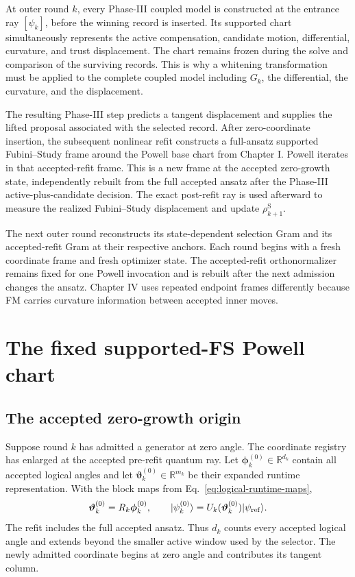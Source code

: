 \documentclass[10pt,twocolumn]{article}
\newcommand{\ket}[1]{\lvert #1\rangle}
\begin{document}
At outer round \(k\), every Phase-III coupled model is constructed at the
entrance ray \([\psi_k]\), before the winning record is inserted. Its supported
chart simultaneously represents the active compensation, candidate motion,
differential, curvature, and trust displacement. The chart remains frozen
during the solve and comparison of the surviving records. This is
why a whitening transformation must be applied to the complete coupled model
including \(G_k\), the differential, the curvature, and the displacement.

The resulting Phase-III step predicts a tangent displacement and supplies the
lifted proposal associated with the selected record. After zero-coordinate
insertion, the subsequent nonlinear refit constructs
a full-ansatz supported Fubini--Study frame around the Powell base chart from
Chapter I. Powell iterates in that accepted-refit frame. This is a new frame at
the accepted zero-growth state, independently rebuilt from the full accepted
ansatz after the Phase-III active-plus-candidate decision. The exact post-refit
ray is used afterward to
measure the realized Fubini--Study displacement and update
\(\rho_{k+1}^{\mathrm S}\).

The next outer round reconstructs its state-dependent selection Gram and its
accepted-refit Gram at their respective anchors. Each round begins with a fresh
coordinate frame and fresh optimizer state. The accepted-refit orthonormalizer
remains fixed for one Powell invocation and is rebuilt after the next admission
changes the ansatz. Chapter IV uses repeated endpoint frames differently
because FM carries curvature information between accepted inner moves.

\section*{The fixed supported-FS Powell chart}

\subsection*{The accepted zero-growth origin}

Suppose round \(k\) has admitted a generator at zero angle. The coordinate
registry has enlarged at the accepted pre-refit quantum ray. Let
\(\bm\phi_k^{(0)}\in\mathbb R^{d_k}\) contain all accepted logical
angles and let \(\bm\vartheta_k^{(0)}\in\mathbb R^{m_k}\) be their expanded
runtime representation. With the block maps from
Eq.~\eqref{eq:logical-runtime-maps},
\begin{equation}
\bm\vartheta_k^{(0)}=R_k\bm\phi_k^{(0)},
\qquad
\ket{\psi_k^{(0)}}
=U_k(\bm\vartheta_k^{(0)})\ket{\psi_{\rm ref}}.
\label{eq:sr-refit-origin}
\end{equation}
The refit includes the full accepted ansatz. Thus \(d_k\) counts every
accepted logical angle and extends beyond the smaller active window used by the
selector. The newly admitted coordinate begins at zero angle and contributes
its tangent column.
\end{document}
